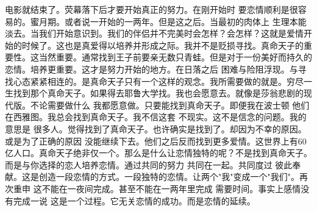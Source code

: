 电影就结束了。荧幕落下后才要开始真正的努力。在刚开始时 要恋情顺利是很容易的。蜜月期。或者说一开始的一两年。但是这之后。当最初的肉体上 生理本能淡去。当我们开始意识到。我们的伴侣并不完美时会怎样？会怎样？这就是爱情开始的时候了。这也是真爱得以培养并形成之际。我并不是贬损寻找。真命天子的重要性。这当然重要。通常找到王子前要亲无数只青蛙。但是对于一份美好而持久的恋情。培养更重要。这才是努力开始的地方。在日落之后 困难与险阻浮现。与寻找心态紧紧相连的。是真命天子只有一个这样的观念。我所需要做的就是。穷尽一生找到那个真命天子。如果得去耶鲁大学找。我也会愿意去。就像是莎翁悲剧的现代版。不论需要做什么 我都愿意做。只要能找到真命天子。即便我在波士顿 他们在西雅图。我总会找到真命天子。我不信这套 不现实。这不是信念的问题。我的意思是 很多人。觉得找到了真命天子。也许确实是找到了。却因为不幸的原因。或是为了正确的原因 没能继续下去。他们之后反而找到更多爱情。这世界上有60亿人口。真命天子绝非仅一个。那么是什么让恋情独特的呢？不是找到真命天子。而是与你选择的恋人培养恋情。通过共同的努力 共同在一起。共同度过 彼此奉献。这是创造一段恋情的方式。一段独特的恋情。让两个"我"变成一个"我们"。再次重申 这不能在一夜间完成。甚至不能在一两年里完成 需要时间。事实上感情没有完成一说 这是一个过程。它无关恋情的成功。而是恋情的延续。 

